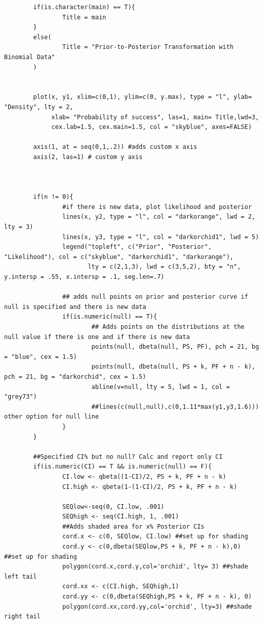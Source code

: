 \begin{lstlisting}
        if(is.character(main) == T){
                Title = main
        }
        else(
                Title = "Prior-to-Posterior Transformation with Binomial Data"
        )
        
        
        plot(x, y1, xlim=c(0,1), ylim=c(0, y.max), type = "l", ylab= "Density", lty = 2,
             xlab= "Probability of success", las=1, main= Title,lwd=3,
             cex.lab=1.5, cex.main=1.5, col = "skyblue", axes=FALSE)
        
        axis(1, at = seq(0,1,.2)) #adds custom x axis
        axis(2, las=1) # custom y axis
        
        
        
        if(n != 0){
                #if there is new data, plot likelihood and posterior
                lines(x, y2, type = "l", col = "darkorange", lwd = 2, lty = 3)
                lines(x, y3, type = "l", col = "darkorchid1", lwd = 5)
                legend("topleft", c("Prior", "Posterior", "Likelihood"), col = c("skyblue", "darkorchid1", "darkorange"), 
                       lty = c(2,1,3), lwd = c(3,5,2), bty = "n", y.intersp = .55, x.intersp = .1, seg.len=.7)
                
                ## adds null points on prior and posterior curve if null is specified and there is new data
                if(is.numeric(null) == T){
                        ## Adds points on the distributions at the null value if there is one and if there is new data
                        points(null, dbeta(null, PS, PF), pch = 21, bg = "blue", cex = 1.5)
                        points(null, dbeta(null, PS + k, PF + n - k), pch = 21, bg = "darkorchid", cex = 1.5)
                        abline(v=null, lty = 5, lwd = 1, col = "grey73")
                        ##lines(c(null,null),c(0,1.11*max(y1,y3,1.6))) other option for null line
                }
        }
        
        ##Specified CI% but no null? Calc and report only CI
        if(is.numeric(CI) == T && is.numeric(null) == F){
                CI.low <- qbeta((1-CI)/2, PS + k, PF + n - k)
                CI.high <- qbeta(1-(1-CI)/2, PS + k, PF + n - k)
                
                SEQlow<-seq(0, CI.low, .001)
                SEQhigh <- seq(CI.high, 1, .001)
                ##Adds shaded area for x% Posterior CIs
                cord.x <- c(0, SEQlow, CI.low) ##set up for shading
                cord.y <- c(0,dbeta(SEQlow,PS + k, PF + n - k),0) ##set up for shading
                polygon(cord.x,cord.y,col='orchid', lty= 3) ##shade left tail
                cord.xx <- c(CI.high, SEQhigh,1) 
                cord.yy <- c(0,dbeta(SEQhigh,PS + k, PF + n - k), 0)
                polygon(cord.xx,cord.yy,col='orchid', lty=3) ##shade right tail
                

\end{lstlisting}
